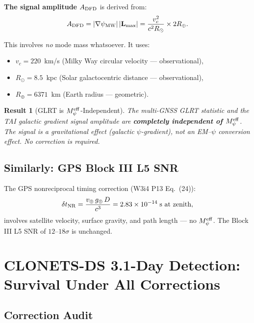 \documentclass[aps,prd,twocolumn,superscriptaddress,nofootinbib]{revtex4-2}
\newcommand{\Meff}{M_\psi^{\rm eff}}
\newcommand{\ee}[1]{\times 10^{#1}}
\newtheorem{result}{Result}
\begin{document}
\textbf{The signal amplitude $A_{\rm DFD}$} is derived from:
\begin{equation}
A_{\rm DFD} = |\nabla\psi_{\rm MW}|\,|\mathbf{L}_{\rm max}|
= \frac{v_c^2}{c^2 R_\odot}\times 2R_\oplus.
\label{eq:A_DFD}
\end{equation}

This involves \emph{no} mode mass whatsoever. It uses:
\begin{itemize}
\item $v_c = 220$~km/s (Milky Way circular velocity --- observational),
\item $R_\odot = 8.5$~kpc (Solar galactocentric distance --- observational),
\item $R_\oplus = 6371$~km (Earth radius --- geometric).
\end{itemize}

\begin{result}[GLRT is $\Meff$-Independent]
\label{res:GLRT}
The multi-GNSS GLRT statistic and the TAI galactic gradient signal
amplitude are \textbf{completely independent of $\Meff$}. The signal
is a gravitational effect (galactic $\psi$-gradient), not an EM--$\psi$
conversion effect. No correction is required.
\end{result}

\subsection{Similarly: GPS Block III L5 SNR}

The GPS nonreciprocal timing correction (W3i4 P13 Eq.~(24)):
\begin{equation}
\delta t_{\rm NR} = \frac{v_\oplus\,g_\oplus\,D}{c^3}
= 2.83\ee{-14}\;\text{s at zenith},
\end{equation}
involves satellite velocity, surface gravity, and path length ---
no $\Meff$. The Block III L5 SNR of $12$--$18\sigma$ is unchanged.

\section{CLONETS-DS 3.1-Day Detection: Survival Under All Corrections}
\label{sec:CLONETS}

\subsection{Correction Audit}
\end{document}
